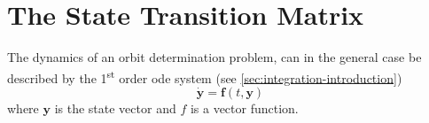\section{The State Transition Matrix}\label{sec:state-transition-matrix}

The dynamics of an orbit determination problem, can in the general case be 
described by the 1\textsuperscript{st} order \gls{ode} system (see \autoref{sec:integration-introduction})
\begin{equation}\label{eq:tapley421}
  \bm{\dot{y}} = \bm{f}(t, \bm{y})
\end{equation}
where $\bm{y}$ is the state vector and $f$ is a vector function.

